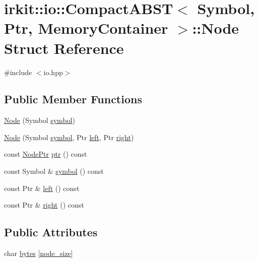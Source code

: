 \hypertarget{structirkit_1_1io_1_1CompactABST_1_1Node}{}\section{irkit\+:\+:io\+:\+:Compact\+A\+B\+ST$<$ Symbol, Ptr, Memory\+Container $>$\+:\+:Node Struct Reference}
\label{structirkit_1_1io_1_1CompactABST_1_1Node}


{\ttfamily \#include $<$io.\+hpp$>$}

\subsection*{Public Member Functions}
\begin{DoxyCompactItemize}
\item 
\mbox{\hyperlink{structirkit_1_1io_1_1CompactABST_1_1Node_a1f43366d4ce1025fe8bb0876f1e50972}{Node}} (Symbol \mbox{\hyperlink{porter2_8hpp_a04438e24473719aaf288c57833717164}{symbol}})
\item 
\mbox{\hyperlink{structirkit_1_1io_1_1CompactABST_1_1Node_afb931dd304adcbc47ecf0078a865a930}{Node}} (Symbol \mbox{\hyperlink{porter2_8hpp_a04438e24473719aaf288c57833717164}{symbol}}, Ptr \mbox{\hyperlink{structirkit_1_1io_1_1CompactABST_1_1Node_aa771d81dcf049a3c4521591912d08c1c}{left}}, Ptr \mbox{\hyperlink{structirkit_1_1io_1_1CompactABST_1_1Node_a0dae16a3d82794135a7d718c220b4d7d}{right}})
\item 
const \mbox{\hyperlink{structirkit_1_1io_1_1CompactABST_1_1NodePtr}{Node\+Ptr}} \mbox{\hyperlink{structirkit_1_1io_1_1CompactABST_1_1Node_aa9472e8e5a01055041fbe129ce14f24a}{ptr}} () const
\item 
const Symbol \& \mbox{\hyperlink{structirkit_1_1io_1_1CompactABST_1_1Node_a2a2eeff16beb918c96b6be9a0203927c}{symbol}} () const
\item 
const Ptr \& \mbox{\hyperlink{structirkit_1_1io_1_1CompactABST_1_1Node_aa771d81dcf049a3c4521591912d08c1c}{left}} () const
\item 
const Ptr \& \mbox{\hyperlink{structirkit_1_1io_1_1CompactABST_1_1Node_a0dae16a3d82794135a7d718c220b4d7d}{right}} () const
\end{DoxyCompactItemize}
\subsection*{Public Attributes}
\begin{DoxyCompactItemize}
\item 
char \mbox{\hyperlink{structirkit_1_1io_1_1CompactABST_1_1Node_abeff4524db0be531e138456b1a5a92d3}{bytes}} \mbox{[}\mbox{\hyperlink{classirkit_1_1io_1_1CompactABST_ada82da5e8d33fc09b71a0610d14ddaef}{node\+\_\+size}}\mbox{]}
\end{DoxyCompactItemize}



